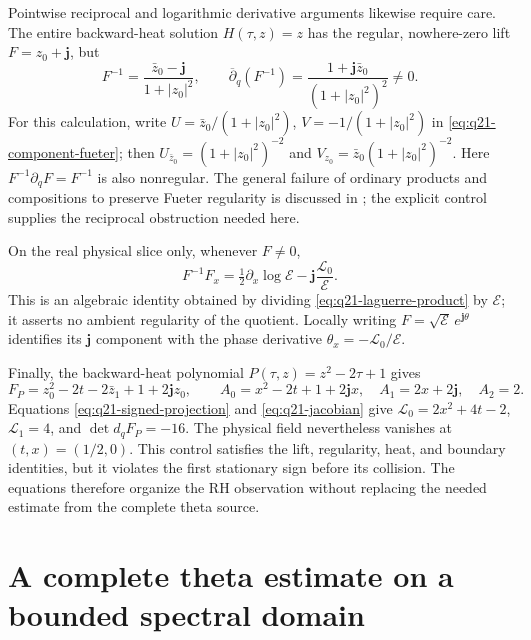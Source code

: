 \documentclass[11pt]{article}
\numberwithin{equation}{section}
\theoremstyle{definition}
\theoremstyle{remark}
\newcommand{\Lag}{\mathscr L}
\begin{document}
Pointwise reciprocal and logarithmic derivative arguments likewise
require care. The entire backward-heat solution \(H(\tau,z)=z\)
has the regular, nowhere-zero lift \(F=z_0+\mathbf j\), but
\begin{equation}
 F^{-1}=\frac{\bar z_0-\mathbf j}{1+|z_0|^2},\qquad
 \overline\partial_q(F^{-1})
 =\frac{1+\mathbf j\bar z_0}{(1+|z_0|^2)^2}\ne0.
 \label{eq:q21-inverse-control}
\end{equation}
For this calculation, write
\(U=\bar z_0/(1+|z_0|^2)\),
\(V=-1/(1+|z_0|^2)\) in
\eqref{eq:q21-component-fueter}; then
\(U_{\bar z_0}=(1+|z_0|^2)^{-2}\) and
\(V_{z_0}=\bar z_0(1+|z_0|^2)^{-2}\).
Here \(F^{-1}\partial_qF=F^{-1}\) is also nonregular.
The general failure of ordinary products and compositions to preserve
Fueter regularity is discussed in \cite{sudbery}; the explicit
control supplies the reciprocal obstruction needed here.

On the real physical slice only, whenever \(F\ne0\),
\begin{equation}
 F^{-1}F_x
 =\tfrac12\partial_x\log\mathcal E
       -\mathbf j\frac{\Lag_0}{\mathcal E}.
 \label{eq:q21-physical-logderivative}
\end{equation}
This is an algebraic identity obtained by dividing
\eqref{eq:q21-laguerre-product} by \(\mathcal E\); it asserts no
ambient regularity of the quotient. Locally writing
\(F=\sqrt{\mathcal E}\,e^{\mathbf j\theta}\) identifies its
\(\mathbf j\) component with the phase derivative
\(\theta_x=-\Lag_0/\mathcal E\).

Finally, the backward-heat polynomial
\(P(\tau,z)=z^2-2\tau+1\) gives
\[
 F_P=z_0^2-2t-2\bar z_1+1+2\mathbf jz_0,
 \qquad
 A_0=x^2-2t+1+2\mathbf jx,
 \quad A_1=2x+2\mathbf j,
 \quad A_2=2.
\]
Equations \eqref{eq:q21-signed-projection} and
\eqref{eq:q21-jacobian} give
\(\Lag_0=2x^2+4t-2\), \(\Lag_1=4\), and
\(\det d_qF_P=-16\).
The physical field nevertheless vanishes at \((t,x)=(1/2,0)\).
This control satisfies the lift, regularity, heat, and boundary identities,
but it violates the first stationary sign before its collision.
The equations therefore organize the RH observation without replacing
the needed estimate from the complete theta source.



\section{A complete theta estimate on a bounded spectral domain}
\label{sec:theta-central}
\end{document}
